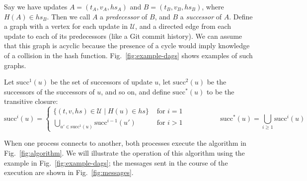 \documentclass[manuscript]{acmart}
\begin{document}
Say we have updates $A = (t_A, v_A, \mathit{hs}_A)$ and $B = (t_B, v_B, \mathit{hs}_B)$, where $H(A) \in \mathit{hs}_B$.
Then we call $A$ a \emph{predecessor} of $B$, and $B$ a \emph{successor} of $A$.
Define a graph with a vertex for each update in $\mathcal{U}$, and a directed edge from each update to each of its predecessors (like a Git commit history).
We can assume that this graph is acyclic because the presence of a cycle would imply knowledge of a collision in the hash function.
Fig.~\ref{fig:example-dags} shows examples of such graphs.

Let $\mathrm{succ}^1(u)$ be the set of successors of update $u$, let $\mathrm{succ}^2(u)$ be the successors of the successors of $u$, and so on, and define $\mathrm{succ}^*(u)$ to be the transitive closure:
\[
\mathrm{succ}^i(u) =
\begin{cases}
\{(t, v, \mathit{hs}) \in \mathcal{U} \mid H(u) \in \mathit{hs}\} & \text{ for } i=1 \\
\bigcup_{u' \in \mathrm{succ}^1(u)} \mathrm{succ}^{i-1}(u') & \text{ for } i>1
\end{cases}
\hspace{60pt}
\mathrm{succ}^*(u) = \bigcup_{i \ge 1} \mathrm{succ}^i(u)
\]

When one process connects to another, both processes execute the algorithm in Fig.~\ref{fig:algorithm}.
We will illustrate the operation of this algorithm using the example in Fig.~\ref{fig:example-dags}; the messages sent in the course of the execution are shown in Fig.~\ref{fig:messages}.
\end{document}
